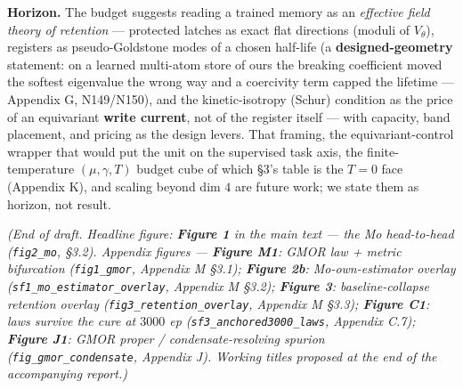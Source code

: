 \documentclass[10pt]{article}
\begin{document}
\textbf{Horizon.} The budget suggests reading a trained memory as an \emph{effective field theory of retention} --- protected latches as exact flat directions (moduli of $V_\theta$), registers as pseudo-Goldstone modes of a chosen half-life (a \textbf{designed-geometry} statement: on a learned multi-atom store of ours the breaking coefficient moved the softest eigenvalue the wrong way and a coercivity term capped the lifetime --- Appendix G, N149/N150), and the kinetic-isotropy (Schur) condition as the price of an equivariant \textbf{write current}, not of the register itself --- with capacity, band placement, and pricing as the design levers. That framing, the equivariant-control wrapper that would put the unit on the supervised task axis, the finite-temperature $(\mu,\gamma,T)$ budget cube of which \S3's table is the $T=0$ face (Appendix K), and scaling beyond dim $4$ are future work; we state them as horizon, not result.



\emph{(End of draft. Headline figure: \textbf{Figure 1} in the main text --- the Mo head-to-head (\texttt{fig2\_mo}, \S3.2). Appendix figures --- \textbf{Figure M1}: GMOR law + metric bifurcation (\texttt{fig1\_gmor}, Appendix M \S3.1); \textbf{Figure 2b}: Mo-own-estimator overlay (\texttt{sf1\_mo\_estimator\_overlay}, Appendix M \S3.2); \textbf{Figure 3}: baseline-collapse retention overlay (\texttt{fig3\_retention\_overlay}, Appendix M \S3.3); \textbf{Figure C1}: laws survive the cure at $3000$ ep (\texttt{sf3\_anchored3000\_laws}, Appendix C.7); \textbf{Figure J1}: GMOR proper / condensate-resolving spurion (\texttt{fig\_gmor\_condensate}, Appendix J). Working titles proposed at the end of the accompanying report.)}
\end{document}

